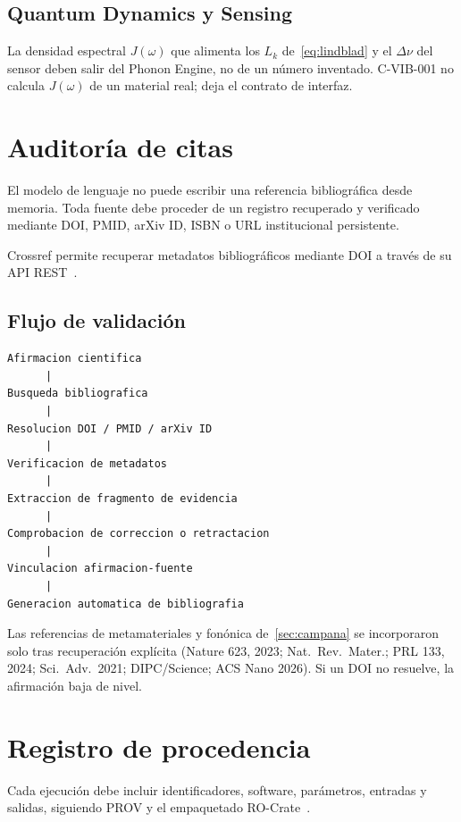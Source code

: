 \documentclass[11pt,a4paper]{article}
\begin{document}
\subsection{Quantum Dynamics y Sensing}

La densidad espectral $J(\omega)$ que alimenta los $L_k$ de~\eqref{eq:lindblad} y el $\Delta\nu$ del sensor deben salir del Phonon Engine, no de un número inventado. C-VIB-001 no calcula $J(\omega)$ de un material real; deja el contrato de interfaz.

\section{Auditoría de citas}

El modelo de lenguaje no puede escribir una referencia bibliográfica desde memoria. Toda fuente debe proceder de un registro recuperado y verificado mediante DOI, PMID, arXiv ID, ISBN o URL institucional persistente.

Crossref permite recuperar metadatos bibliográficos mediante DOI a través de su API REST~\cite{crossref_api}.

\subsection{Flujo de validación}
\begin{lstlisting}
Afirmacion cientifica
      |
Busqueda bibliografica
      |
Resolucion DOI / PMID / arXiv ID
      |
Verificacion de metadatos
      |
Extraccion de fragmento de evidencia
      |
Comprobacion de correccion o retractacion
      |
Vinculacion afirmacion-fuente
      |
Generacion automatica de bibliografia
\end{lstlisting}

Las referencias de metamateriales y fonónica de~\cref{sec:campana} se incorporaron solo tras recuperación explícita (Nature 623, 2023; Nat.\ Rev.\ Mater.; PRL 133, 2024; Sci.\ Adv.\ 2021; DIPC/Science; ACS Nano 2026). Si un DOI no resuelve, la afirmación baja de nivel.

\section{Registro de procedencia}

Cada ejecución debe incluir identificadores, software, parámetros, entradas y salidas, siguiendo PROV y el empaquetado RO-Crate~\cite{rocrate_workflow,rocrate_provenance}.
\end{document}
